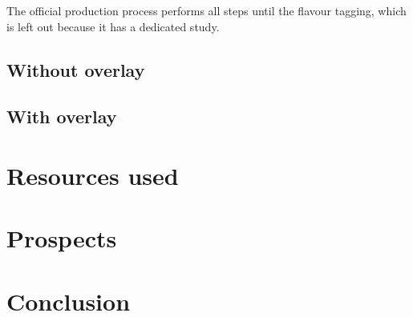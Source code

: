 \documentclass{article}
\begin{document}
The official production process performs all steps until the flavour tagging, which is left out because it has 
a dedicated study.

\subsection{Without overlay}

\subsection{With overlay}

\section{Resources used}

\section{Prospects}
\section{Conclusion}
\end{document}
